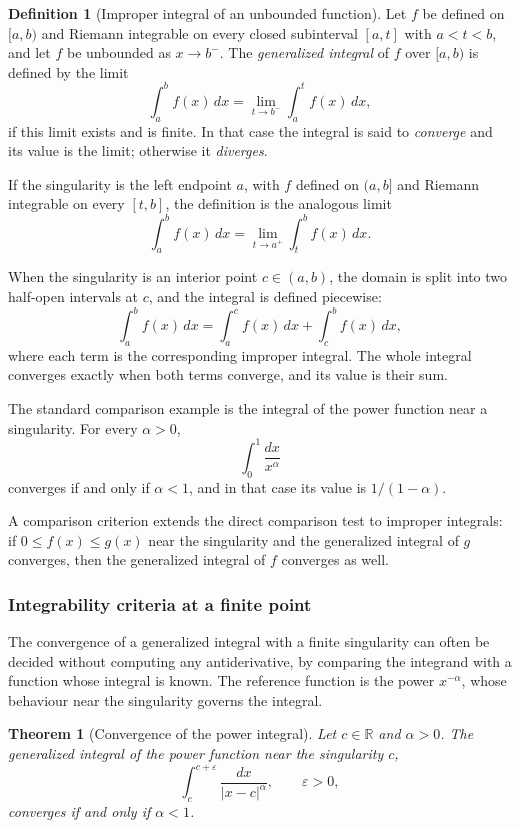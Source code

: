 \documentclass[11pt,a4paper]{article}
\theoremstyle{definition} \newtheorem{definition}{Definition} \theoremstyle{plain} \newtheorem{theorem}{Theorem}
\begin{document}
\begin{definition}[Improper integral of an unbounded function]
Let $f$ be defined on $[a,b)$ and Riemann integrable on every closed
subinterval $[a,t]$ with $a<t<b$, and let $f$ be unbounded as $x\to b^-$.
The \emph{generalized integral} of $f$ over $[a,b)$ is defined by the limit
\[
\int_a^b f(x)\,dx = \lim_{t\to b^-}\int_a^t f(x)\,dx,
\]
if this limit exists and is finite.  In that case the integral is said to
\emph{converge} and its value is the limit; otherwise it \emph{diverges}.
\end{definition}

If the singularity is the left endpoint $a$, with $f$ defined on $(a,b]$ and
Riemann integrable on every $[t,b]$, the definition is the analogous limit
\[
\int_a^b f(x)\,dx = \lim_{t\to a^+}\int_t^b f(x)\,dx.
\]

When the singularity is an interior point $c\in(a,b)$, the domain is split
into two half-open intervals at $c$, and the integral is defined piecewise:
\[
\int_a^b f(x)\,dx = \int_a^c f(x)\,dx + \int_c^b f(x)\,dx,
\]
where each term is the corresponding improper integral.  The whole integral
converges exactly when both terms converge, and its value is their sum.

The standard comparison example is the integral of the power function near a
singularity.  For every $\alpha>0$,
\[
\int_0^1 \frac{dx}{x^\alpha}
\]
converges if and only if $\alpha<1$, and in that case its value is
$1/(1-\alpha)$.

A comparison criterion extends the direct comparison test to improper
integrals: if $0\le f(x)\le g(x)$ near the singularity and the generalized
integral of $g$ converges, then the generalized integral of $f$ converges as
well.
\subsubsection{Integrability criteria at a finite point}

The convergence of a generalized integral with a finite singularity can
often be decided without computing any antiderivative, by comparing the
integrand with a function whose integral is known.  The reference function
is the power $x^{-\alpha}$, whose behaviour near the singularity governs the
integral.

\begin{theorem}[Convergence of the power integral]\label{thm:power-integral}
Let $c\in\mathbb{R}$ and $\alpha>0$.  The generalized integral of the power
function near the singularity $c$,
\[
\int_c^{c+\varepsilon} \frac{dx}{|x-c|^{\alpha}},
\qquad \varepsilon>0,
\]
converges if and only if $\alpha<1$.
\end{theorem}
\end{document}
